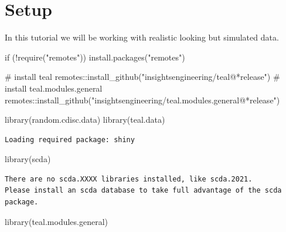 \documentclass[
  letterpaper,
  DIV=11,
  numbers=noendperiod]{scrreprt}
\newenvironment{Shaded}{\begin{snugshade}}{\end{snugshade}}
\newcommand{\CommentTok}[1]{\textcolor[rgb]{0.37,0.37,0.37}{#1}}
\newcommand{\ControlFlowTok}[1]{\textcolor[rgb]{0.00,0.23,0.31}{#1}}
\newcommand{\FunctionTok}[1]{\textcolor[rgb]{0.28,0.35,0.67}{#1}}
\newcommand{\NormalTok}[1]{\textcolor[rgb]{0.00,0.23,0.31}{#1}}
\newcommand{\SpecialCharTok}[1]{\textcolor[rgb]{0.37,0.37,0.37}{#1}}
\newcommand{\StringTok}[1]{\textcolor[rgb]{0.13,0.47,0.30}{#1}}
\begin{document}
\hypertarget{setup}{%
\section{Setup}\label{setup}}

In this tutorial we will be working with realistic looking but simulated
data.

\begin{Shaded}
\begin{Highlighting}[]
\ControlFlowTok{if}\NormalTok{ (}\SpecialCharTok{!}\FunctionTok{require}\NormalTok{(}\StringTok{"remotes"}\NormalTok{)) }\FunctionTok{install.packages}\NormalTok{(}\StringTok{"remotes"}\NormalTok{)}

\CommentTok{\# install teal}
\NormalTok{remotes}\SpecialCharTok{::}\FunctionTok{install\_github}\NormalTok{(}\StringTok{"insightsengineering/teal@*release"}\NormalTok{)}
\CommentTok{\# install teal.modules.general}
\NormalTok{remotes}\SpecialCharTok{::}\FunctionTok{install\_github}\NormalTok{(}\StringTok{"insightsengineering/teal.modules.general@*release"}\NormalTok{)}
\end{Highlighting}
\end{Shaded}

\begin{Shaded}
\begin{Highlighting}[]
\FunctionTok{library}\NormalTok{(random.cdisc.data)}
\FunctionTok{library}\NormalTok{(teal.data)}
\end{Highlighting}
\end{Shaded}

\begin{verbatim}
Loading required package: shiny
\end{verbatim}

\begin{Shaded}
\begin{Highlighting}[]
\FunctionTok{library}\NormalTok{(scda)}
\end{Highlighting}
\end{Shaded}

\begin{verbatim}
There are no scda.XXXX libraries installed, like scda.2021.
Please install an scda database to take full advantage of the scda package.
\end{verbatim}

\begin{Shaded}
\begin{Highlighting}[]
\FunctionTok{library}\NormalTok{(teal.modules.general)}
\end{Highlighting}
\end{Shaded}
\end{document}
